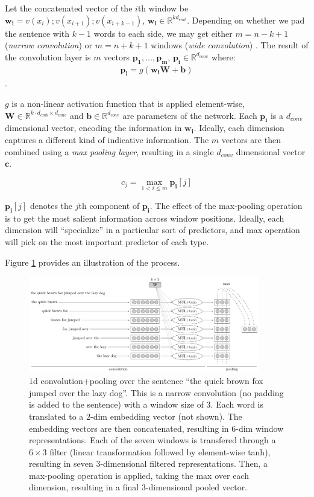 \documentclass[jair,twoside,11pt,theapa]{article}
\newcommand{\m}[1]{\mathbf{#1}}%
\newcommand{\ygcomment}[1]{\textbf{[TODO: #1]}}
\renewcommand{\ygcomment}[1]{}
\begin{document}
{Let the concatenated vector of the $i$th window be $\m{w_i} =
v(x_i);v(x_{i+1});v(x_{i+k-1})$, $\m{w_i} \in \mathbb{R}^{kd_{emb}}$. 
Depending on whether we pad the sentence with $k-1$ words to each side, we may
get either $m=n-k+1$ (\emph{narrow convolution}) or $m=n+k+1$ windows (\emph{wide
convolution}) \cite{kalchbrenner2014convolutional}.  
The result of the convolution layer is $m$ vectors $\m{p_1},\ldots,\m{p_m}$, $\m{p_i}\in \mathbb{R}^{d_{conv}}$ where:
\begin{align*}
\m{p_i}  = g(\m{w_i}\m{W}+\m{b})
\end{align*}.
\ygcomment{TODO: dimensions, terminology:channels;maps }

$g$ is a non-linear activation function that is applied element-wise, $\m{W} \in
\mathbb{R}^{k\cdot d_{emb} \times d_{conv}}$ and $\m{b} \in
\mathbb{R}^{d_{conv}}$ are parameters of the network.  Each $\m{p_i}$ is a
$d_{conv}$ dimensional vector, encoding the information in $\m{w_i}$. Ideally,
each dimension captures a different kind of indicative information.  The $m$
vectors are then combined using a \emph{max pooling layer}, resulting in a
single $d_{conv}$ dimensional vector $\m{c}$.

\[
c_j = \max_{1 < i \leq m} \m{p_i}[j]
\]  

\noindent $\m{p_i}[j]$ denotes the $j$th component of $\m{p_i}$.
The effect of the max-pooling operation is to get the most salient information across
window positions. Ideally, each dimension will ``specialize'' in a particular
sort of predictors, and max operation will pick on the most important
predictor of each type.

Figure \ref{fig:cnn} provides an illustration of the process.
\begin{figure}[t]
\begin{center}
\includegraphics[width=0.9\textwidth]{cnn.pdf}
\end{center}
\caption{$1$d convolution+pooling over the sentence ``the quick brown fox
jumped over the lazy dog''. This is a narrow convolution (no padding is added to
the sentence) with a window size of 3.  Each word is translated to a $2$-dim
embedding vector (not shown). The embedding vectors are then concatenated,
resulting in $6$-dim window representations.
Each of the seven windows is transfered through a $6\times 3$ filter (linear transformation followed by element-wise tanh),
resulting in seven $3$-dimensional filtered representations. Then, a max-pooling
operation is applied, taking the max over each dimension, resulting in a final
$3$-dimensional pooled vector.}
\label{fig:cnn}
\end{figure}

}
\end{document}
